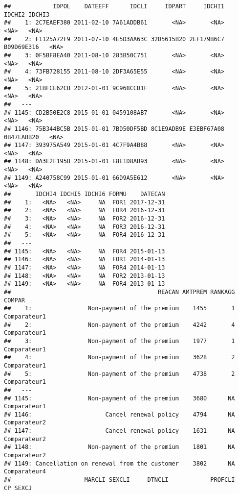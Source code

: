 \documentclass[
]{article}
\begin{document}
\begin{verbatim}
##            IDPOL    DATEEFF      IDCLI     IDPART     IDCHI1     IDCHI2 IDCHI3
##    1: 2C7EAEF380 2011-02-10 7A61ADDB61       <NA>       <NA>       <NA>   <NA>
##    2: F1125A72F9 2011-07-10 4E5D3AA63C 32D5615B20 2EF179B6C7 B09D69E316   <NA>
##    3: 0F5BF8EA40 2011-08-10 283B50C751       <NA>       <NA>       <NA>   <NA>
##    4: 73FB728155 2011-08-10 2DF3A65E55       <NA>       <NA>       <NA>   <NA>
##    5: 21BFCE62CB 2012-01-01 9C968CCD1F       <NA>       <NA>       <NA>   <NA>
##   ---                                                                         
## 1145: CD2B50E2C8 2015-01-01 0459108AB7       <NA>       <NA>       <NA>   <NA>
## 1146: 75B344BC5B 2015-01-01 7BD50DF5BD 8C1E9ADB9E E3EBF67A08 0B47EABB20   <NA>
## 1147: 393975A549 2015-01-01 4C7F9A4B88       <NA>       <NA>       <NA>   <NA>
## 1148: DA3E2F195B 2015-01-01 E8E1D8AB93       <NA>       <NA>       <NA>   <NA>
## 1149: A240758C99 2015-01-01 66D9A5E612       <NA>       <NA>       <NA>   <NA>
##       IDCHI4 IDCHI5 IDCHI6 FORMU    DATECAN
##    1:   <NA>   <NA>     NA  FOR1 2017-12-31
##    2:   <NA>   <NA>     NA  FOR4 2016-12-31
##    3:   <NA>   <NA>     NA  FOR2 2016-12-31
##    4:   <NA>   <NA>     NA  FOR3 2016-12-31
##    5:   <NA>   <NA>     NA  FOR4 2016-12-31
##   ---                                      
## 1145:   <NA>   <NA>     NA  FOR4 2015-01-13
## 1146:   <NA>   <NA>     NA  FOR1 2014-01-13
## 1147:   <NA>   <NA>     NA  FOR4 2014-01-13
## 1148:   <NA>   <NA>     NA  FOR2 2013-01-13
## 1149:   <NA>   <NA>     NA  FOR4 2013-01-13
##                                          REACAN AMTPREM RANKAGG       COMPAR
##    1:                Non-payment of the premium    1455       1 Comparateur1
##    2:                Non-payment of the premium    4242       4 Comparateur1
##    3:                Non-payment of the premium    1977       1 Comparateur1
##    4:                Non-payment of the premium    3628       2 Comparateur1
##    5:                Non-payment of the premium    4738       2 Comparateur1
##   ---                                                                       
## 1145:                Non-payment of the premium    3680      NA Comparateur1
## 1146:                     Cancel renewal policy    4794      NA Comparateur2
## 1147:                     Cancel renewal policy    1631      NA Comparateur2
## 1148:                Non-payment of the premium    1801      NA Comparateur2
## 1149: Cancellation on renewal from the customer    3802      NA Comparateur4
##                     MARCLI SEXCLI     DTNCLI            PROFCLI    CP SEXCJ

\end{verbatim}
\end{document}
